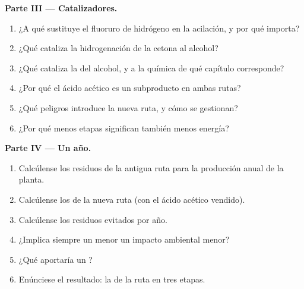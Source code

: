 \begin{problem}
\medskip\noindent\textbf{Parte III --- Catalizadores.}
\begin{enumerate}[resume]
  \item ¿A qué sustituye el fluoruro de hidrógeno en la acilación, y por qué importa?
  \item ¿Qué cataliza la hidrogenación de la cetona al alcohol?
  \item ¿Qué cataliza la  del alcohol, y a la química de qué capítulo corresponde?
  \item ¿Por qué el ácido acético es un subproducto en ambas rutas?
  \item ¿Qué peligros introduce la nueva ruta, y cómo se gestionan?
  \item ¿Por qué menos etapas significan también menos energía?
\end{enumerate}

\medskip\noindent\textbf{Parte IV --- Un año.}
\begin{enumerate}[resume]
  \item Calcúlense los residuos de la antigua ruta para la producción anual de la planta.
  \item Calcúlense los de la nueva ruta (con el ácido acético vendido).
  \item Calcúlense los residuos evitados por año.
  \item ¿Implica siempre un  menor un impacto ambiental menor?
  \item ¿Qué aportaría un ?
  \item Enúnciese el resultado: la  de la ruta en tres etapas.
\end{enumerate}
\end{problem}
